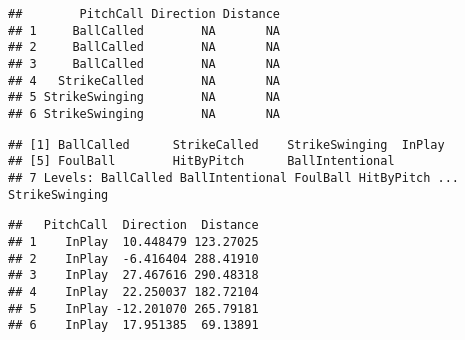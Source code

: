 \documentclass[]{article}
\newenvironment{Shaded}{\begin{snugshade}}{\end{snugshade}}
\newcommand{\KeywordTok}[1]{\textcolor[rgb]{0.13,0.29,0.53}{\textbf{#1}}}
\newcommand{\StringTok}[1]{\textcolor[rgb]{0.31,0.60,0.02}{#1}}
\newcommand{\OperatorTok}[1]{\textcolor[rgb]{0.81,0.36,0.00}{\textbf{#1}}}
\newcommand{\NormalTok}[1]{#1}
\begin{document}
\begin{Shaded}
\end{Shaded}

\begin{verbatim}
##        PitchCall Direction Distance
## 1     BallCalled        NA       NA
## 2     BallCalled        NA       NA
## 3     BallCalled        NA       NA
## 4   StrikeCalled        NA       NA
## 5 StrikeSwinging        NA       NA
## 6 StrikeSwinging        NA       NA
\end{verbatim}

\begin{Shaded}
\end{Shaded}

\begin{verbatim}
## [1] BallCalled      StrikeCalled    StrikeSwinging  InPlay         
## [5] FoulBall        HitByPitch      BallIntentional
## 7 Levels: BallCalled BallIntentional FoulBall HitByPitch ... StrikeSwinging
\end{verbatim}

\begin{Shaded}
\end{Shaded}

\begin{verbatim}
##   PitchCall  Direction  Distance
## 1    InPlay  10.448479 123.27025
## 2    InPlay  -6.416404 288.41910
## 3    InPlay  27.467616 290.48318
## 4    InPlay  22.250037 182.72104
## 5    InPlay -12.201070 265.79181
## 6    InPlay  17.951385  69.13891
\end{verbatim}
\end{document}
